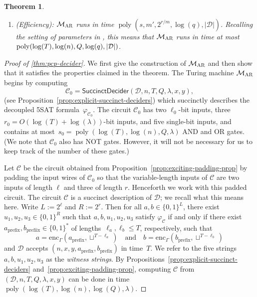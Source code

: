 \documentclass[11pt]{article}
\newtheorem{theorem}{Theorem}[section]
\theoremstyle{definition}
\newcommand{\F}{\ensuremath{\mathbb{F}}}
\DeclareMathOperator{\poly}{poly}
\newcommand{\decider}{\mathcal{D}}
\newcommand{\gamestyle}[1]{\ensuremath{\textsc{#1}}\xspace}
\newcommand{\ar}{\gamestyle{AR}}
\newcommand{\succinctdecider}{\ensuremath{\mathsf{SuccinctDecider}}}
\newcommand{\circuit}{\mathcal{C}}
\newcommand{\pcpverifier}{\mathcal{M}_\ar}
\newcommand{\qlen}{Q}
\begin{document}
\begin{theorem}
\begin{enumerate}
\begin{enumerate}
    \item On a random~$x \in \F_q^m$, the probability that $f_1(x) \neq g_1(x)$
      is at most $0.2$, and likewise for~$f_2$ and~$g_2$.
    \end{enumerate}
  \item[4.]
    \emph{(Efficiency):} $\pcpverifier$ runs in time $\poly(s, m', 2^{r/m},
    \log(q),|\decider|)$.
    Recalling the setting of parameters in , this means that
    $\pcpverifier$ runs in time at most~$\poly(\log(T), \log(n), \qlen,
    \break \log(q), |\decider|)$.
  \end{enumerate}
\end{theorem}

\begin{proof}[Proof of \cref{thm:pcp-decider}]
  We first give the construction of $\pcpverifier$ and then show that it
  satisfies the properties claimed in the theorem.
  The Turing machine $\pcpverifier$ begins by computing
  \[
    \circuit_0 = \succinctdecider(\decider, n, T, \qlen, \lambda, x, y),
  \]
  (see Proposition~\ref{prop:explicit-succinct-deciders}) which succinctly
  describes the decoupled 5SAT formula~$\varphi_{\circuit_0}$.
  The circuit $\circuit_0$ has two $\ell_0$-bit inputs, three $r_0 = O(\log(T) +
  \log(\lambda))$-bit inputs, and five single-bit inputs, and contains at
  most~$s_0 = \poly(\log(T), \log(n), \qlen,\lambda)$ AND and OR gates.
  (We note that $\circuit_0$ also has NOT gates.
  However, it will not be necessary for us to keep track of the number of these gates.)

  Let $\circuit$ be the circuit obtained from
  Proposition~\ref{prop:exciting-padding-prop} by padding the input wires of
  $\circuit_0$ so that the variable-length inputs of $\circuit$ are two inputs
  of length $\ell$ and three of length $r$.
  Henceforth we work with this padded circuit.
  The circuit $\circuit$ is a succinct description of $\decider$; we recall what
  this means here.
  Write $L:= 2^{\ell}$ and $R := 2^{r}$.
  Then for all $a, b\in \{0, 1\}^L$, there exist $u_1, u_2, u_3 \in \{0, 1\}^R$
  such that $a, b, u_1, u_2, u_3$ satisfy $\varphi_{\circuit}$ if and only if
  there exist $a_{\mathrm{prefix}}, b_{\mathrm{prefiix}} \in \{0, 1\}^*$ of
  lengths~$\ell_a, \ell_b \leq T$, respectively, such that
  \begin{equation*}
    a = \mathrm{enc}_\Gamma(a_{\mathrm{prefix}}, \sqcup^{T - \ell_a})
    \quad
    \text{and}
    \quad
    b = \mathrm{enc}_\Gamma(b_{\mathrm{prefix}}, \sqcup^{T - \ell_b})
  \end{equation*}
  and $\decider$ accepts $(n, x, y, a_{\mathrm{prefix}}, b_{\mathrm{prefix}})$
  in time~$T$.
  We refer to the five strings $a, b, u_1, u_2, u_3$ as the \emph{witness
  strings}.
  By Propositions~\ref{prop:explicit-succinct-deciders}
  and~\ref{prop:exciting-padding-prop}, computing $\circuit$ from $(\decider, n,
  T, \qlen, \lambda, x, y)$ can be done in time $\poly(\log(T), \log(n),
  \log(\qlen),\lambda)$.


\end{proof}
\end{document}
